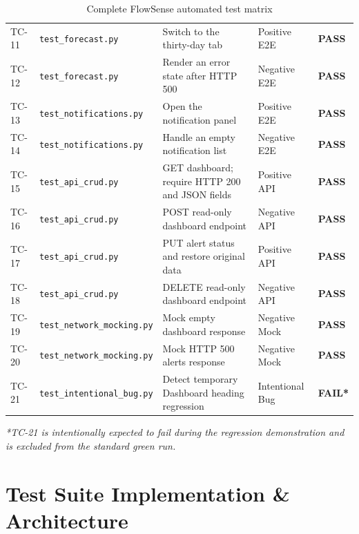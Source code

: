 \documentclass[11pt,a4paper]{article}
\begin{document}
\begin{table}[H]
\begin{tabularx}{\linewidth}{@{}l l X l l@{}}
\rowcolor{lightgray}
TC-11 & \texttt{test\_forecast.py} & Switch to the thirty-day tab & Positive E2E & \textcolor{passgreen}{\textbf{PASS}} \\
TC-12 & \texttt{test\_forecast.py} & Render an error state after HTTP 500 & Negative E2E & \textcolor{passgreen}{\textbf{PASS}} \\
TC-13 & \texttt{test\_notifications.py} & Open the notification panel & Positive E2E & \textcolor{passgreen}{\textbf{PASS}} \\
\rowcolor{lightgray}
TC-14 & \texttt{test\_notifications.py} & Handle an empty notification list & Negative E2E & \textcolor{passgreen}{\textbf{PASS}} \\
TC-15 & \texttt{test\_api\_crud.py} & GET dashboard; require HTTP 200 and JSON fields & Positive API & \textcolor{passgreen}{\textbf{PASS}} \\
TC-16 & \texttt{test\_api\_crud.py} & POST read-only dashboard endpoint & Negative API & \textcolor{passgreen}{\textbf{PASS}} \\
\rowcolor{lightgray}
TC-17 & \texttt{test\_api\_crud.py} & PUT alert status and restore original data & Positive API & \textcolor{passgreen}{\textbf{PASS}} \\
TC-18 & \texttt{test\_api\_crud.py} & DELETE read-only dashboard endpoint & Negative API & \textcolor{passgreen}{\textbf{PASS}} \\
TC-19 & \texttt{test\_network\_mocking.py} & Mock empty dashboard response & Negative Mock & \textcolor{passgreen}{\textbf{PASS}} \\
\rowcolor{lightgray}
TC-20 & \texttt{test\_network\_mocking.py} & Mock HTTP 500 alerts response & Negative Mock & \textcolor{passgreen}{\textbf{PASS}} \\
TC-21 & \texttt{test\_intentional\_bug.py} & Detect temporary Dashboard heading regression & Intentional Bug & \textcolor{failred}{\textbf{FAIL*}} \\
\bottomrule
\end{tabularx}
\caption{Complete FlowSense automated test matrix}
\end{table}

\noindent\textit{*TC-21 is intentionally expected to fail during the regression demonstration and is excluded from the standard green run.}

\section{Test Suite Implementation \& Architecture}
\end{document}
